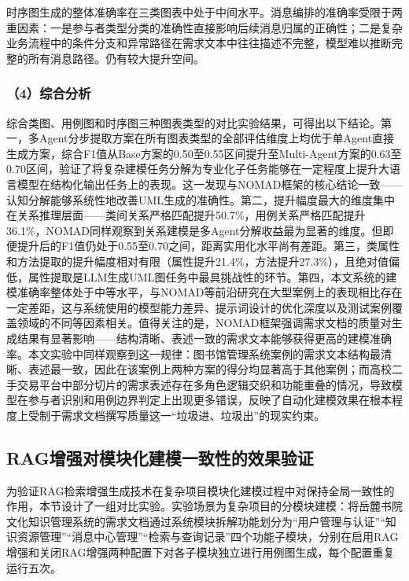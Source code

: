 时序图生成的整体准确率在三类图表中处于中间水平。消息编排的准确率受限于两重因素：一是参与者类型分类的准确性直接影响后续消息归属的正确性；二是复杂业务流程中的条件分支和异常路径在需求文本中往往描述不完整，模型难以推断完整的所有消息路径。仍有较大提升空间。

\subsubsection{（4）综合分析}

综合类图、用例图和时序图三种图表类型的对比实验结果，可得出以下结论。第一，多Agent分步提取方案在所有图表类型的全部评估维度上均优于单Agent直接生成方案，综合F1值从Base方案的0.50至0.55区间提升至Multi-Agent方案的0.63至0.70区间，验证了将复杂建模任务分解为专业化子任务能够在一定程度上提升大语言模型在结构化输出任务上的表现。这一发现与NOMAD框架的核心结论一致——认知分解能够系统性地改善UML生成的准确性\cite{giannouris2025nomad}。第二，提升幅度最大的维度集中在关系推理层面——类间关系严格匹配提升50.7\%，用例关系严格匹配提升36.1\%，NOMAD同样观察到关系建模是多Agent分解收益最为显著的维度。但即便提升后的F1值仍处于0.55至0.70之间，距离实用化水平尚有差距。第三，类属性和方法提取的提升幅度相对有限（属性提升21.4\%，方法提升27.3\%），且绝对值偏低，属性提取是LLM生成UML图任务中最具挑战性的环节。第四，本文系统的建模准确率整体处于中等水平，与NOMAD等前沿研究在大型案例上的表现相比存在一定差距，这与系统使用的模型能力差异、提示词设计的优化深度以及测试案例覆盖领域的不同等因素相关。值得关注的是，NOMAD框架强调需求文档的质量对生成结果有显著影响——结构清晰、表述一致的需求文本能够获得更高的建模准确率。本文实验中同样观察到这一规律：图书馆管理系统案例的需求文本结构最清晰、表述最一致，因此在该案例上两种方案的得分均显著高于其他案例；而高校二手交易平台中部分切片的需求表述存在多角色逻辑交织和功能重叠的情况，导致模型在参与者识别和用例边界判定上出现更多错误，反映了自动化建模效果在根本程度上受制于需求文档撰写质量这一“垃圾进、垃圾出”的现实约束。

\subsection{RAG增强对模块化建模一致性的效果验证}

为验证RAG检索增强生成技术在复杂项目模块化建模过程中对保持全局一致性的作用，本节设计了一组对比实验。实验场景为复杂项目的分模块建模：将岳麓书院文化知识管理系统的需求文档通过系统模块拆解功能划分为“用户管理与认证”“知识资源管理”“消息中心管理”“检索与查询记录”四个功能子模块，分别在启用RAG增强和关闭RAG增强两种配置下对各子模块独立进行用例图生成，每个配置重复运行五次。


